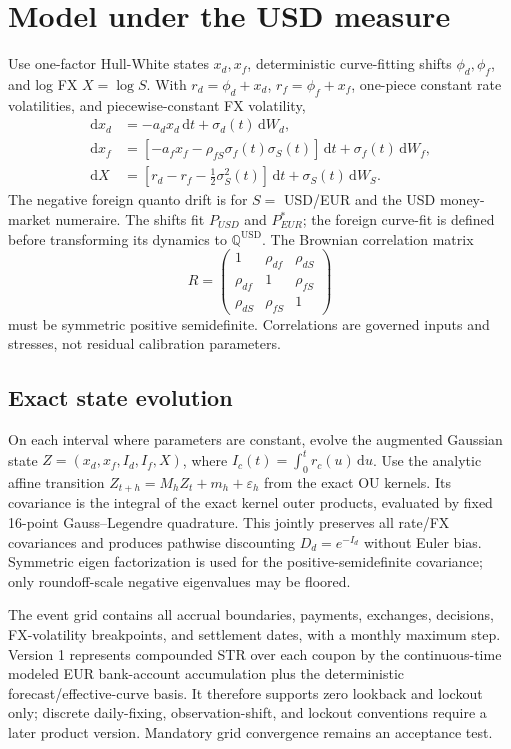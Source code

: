 \documentclass[conference]{IEEEtran}
\newcommand{\Qd}{\mathbb{Q}^{\mathrm{USD}}}
\newcommand{\dd}{\,\mathrm{d}}
\begin{document}
\section{Model under the USD measure}

Use one-factor Hull-White states $x_d,x_f$, deterministic curve-fitting shifts $\phi_d,\phi_f$, and log FX $X=\log S$. With $r_d=\phi_d+x_d$, $r_f=\phi_f+x_f$, one-piece constant rate volatilities, and piecewise-constant FX volatility,
\begin{align}
 \dd x_d&=-a_dx_d\dd t+\sigma_d(t)\dd W_d,\\
 \dd x_f&=\left[-a_fx_f-\rho_{fS}\sigma_f(t)\sigma_S(t)\right]\dd t
             +\sigma_f(t)\dd W_f,\\
 \dd X&=\left[r_d-r_f-\tfrac12\sigma_S^2(t)\right]\dd t+\sigma_S(t)\dd W_S.
\end{align}
The negative foreign quanto drift is for $S=$ USD/EUR and the USD money-market numeraire. The shifts fit $P_{USD}$ and $P_{EUR}^{*}$; the foreign curve-fit is defined before transforming its dynamics to $\Qd$. The Brownian correlation matrix
\[
 R=\begin{pmatrix}1&\rho_{df}&\rho_{dS}\\\rho_{df}&1&\rho_{fS}\\
 \rho_{dS}&\rho_{fS}&1\end{pmatrix}
\]
must be symmetric positive semidefinite. Correlations are governed inputs and stresses, not residual calibration parameters.

\subsection{Exact state evolution}

On each interval where parameters are constant, evolve the augmented Gaussian state
$Z=(x_d,x_f,I_d,I_f,X)$, where $I_c(t)=\int_0^t r_c(u)\dd u$. Use the analytic affine transition $Z_{t+h}=M_hZ_t+m_h+\varepsilon_h$ from the exact OU kernels. Its covariance is the integral of the exact kernel outer products, evaluated by fixed 16-point Gauss--Legendre quadrature. This jointly preserves all rate/FX covariances and produces pathwise discounting $D_d=e^{-I_d}$ without Euler bias. Symmetric eigen factorization is used for the positive-semidefinite covariance; only roundoff-scale negative eigenvalues may be floored.

The event grid contains all accrual boundaries, payments, exchanges, decisions, FX-volatility breakpoints, and settlement dates, with a monthly maximum step. Version 1 represents compounded \texteuro STR over each coupon by the continuous-time modeled EUR bank-account accumulation plus the deterministic forecast/effective-curve basis. It therefore supports zero lookback and lockout only; discrete daily-fixing, observation-shift, and lockout conventions require a later product version. Mandatory grid convergence remains an acceptance test.
\end{document}
